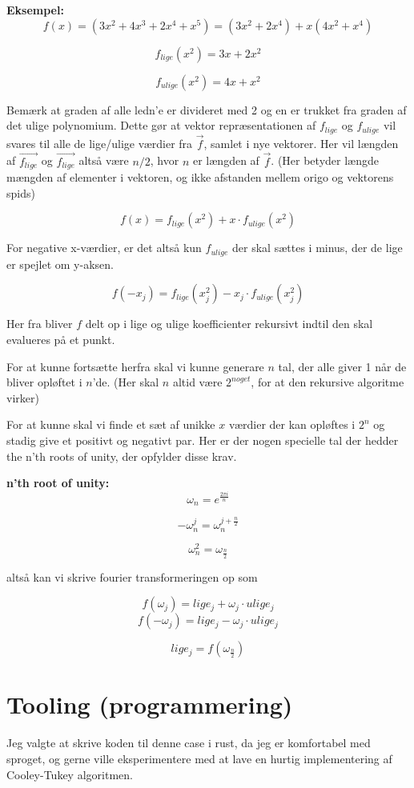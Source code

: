 \documentclass[11pt,a4paper]{article}
\begin{document}
\textbf{Eksempel:}
$$
f(x) = (3x^2 + 4x^3 + 2x^4 + x^5) = (3x^2 + 2x^4) + x(4x^2 + x^4)
$$

$$
f_{lige}(x^2) = 3x + 2x^2
$$

$$
f_{ulige}(x^2) = 4x + x^2
$$

Bemærk at graden af alle ledn'e er divideret med 2 og en er trukket fra graden af det ulige polynomium.
Dette gør at vektor repræsentationen af \(f_{lige}\) og \(f_{ulige}\) vil svares til alle de lige/ulige værdier fra \(\vec{f}\),
samlet i nye vektorer. Her vil længden af \({\vec{f_{lige}}}\) og \({\vec{f_{lige}}}\) altså være \(n/2\), hvor \(n\) er længden af \(\vec{f}\).
(Her betyder længde mængden af elementer i vektoren, og ikke afstanden mellem origo og vektorens spids)

$$
f(x) = f_{lige}(x^2) + x \cdot f_{ulige}(x^2)
$$

For negative x-værdier, er det altså kun \(f_{ulige}\) der skal sættes i minus,
der de lige er spejlet om y-aksen.

$$
f(-x_j) = f_{lige}(x^2_j) - x_j \cdot f_{ulige}(x^2_j)
$$

Her fra bliver \(f\) delt op i lige og ulige koefficienter rekursivt indtil den skal evalueres på et punkt.

For at kunne fortsætte herfra skal vi kunne generare \(n\) tal, der alle giver 1 når de bliver opløftet i \(n\)'de.
(Her skal \(n\) altid være \(2^{noget}\), for at den rekursive algoritme virker)

For at kunne skal vi finde et sæt af unikke \(x\) værdier der kan opløftes i \(2^n\) og stadig give et positivt og negativt par.
Her er der nogen specielle tal der hedder the n'th roots of unity, der opfylder disse krav.

\textbf{n'th root of unity:}
$$
\omega_n = e^{\frac{2\pi i}{n}}
$$

$$
-\omega_n^j = \omega_n^{j+\frac{n}{2}}
$$

$$
\omega_n^2 = \omega_{\frac{n}{2}}
$$

altså kan vi skrive fourier transformeringen op som

$$
f(\omega_j) = lige_j + \omega_j \cdot ulige_j
$$
$$
f(-\omega_j) = lige_j - \omega_j \cdot ulige_j
$$

$$
lige_j = f(\omega_\frac{n}{2})
$$

\section{Tooling (programmering)}
\label{sec:org28f6ed2}
Jeg valgte at skrive koden til denne case i rust, da jeg er komfortabel med sproget,
og gerne ville eksperimentere med at lave en hurtig implementering af Cooley-Tukey algoritmen.
\end{document}

